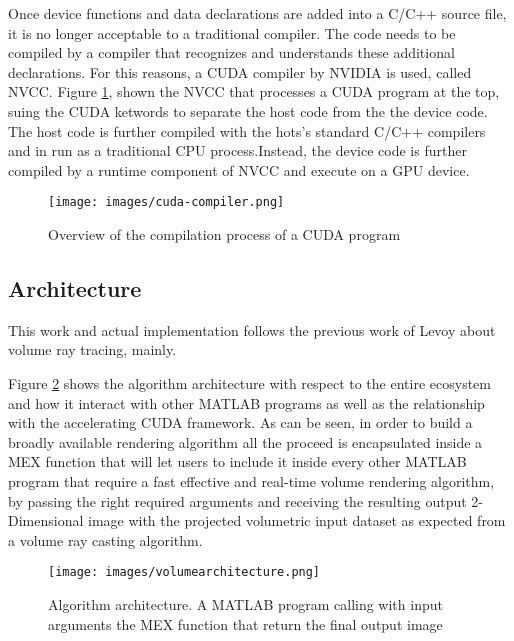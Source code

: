 \documentclass[12pt,a4paper]{extarticle}
\begin{document}
Once device functions and data declarations are added into a C/C++ source file, it is no longer acceptable to a traditional compiler. The code needs to be compiled by a compiler that recognizes and understands these additional declarations. For this reasons, a CUDA compiler by NVIDIA is used, called NVCC.
Figure \ref{fig:cudacompiler}, shown the NVCC that processes a CUDA program at the top, suing the CUDA ketwords to separate the host code from the the device code. The host code is further compiled with the hots's standard C/C++ compilers and in run as a traditional CPU process.Instead, the device code is further compiled by a runtime component of NVCC and execute on a GPU device.
\begin{figure}[hbtp]
\centering
\texttt{[image: images/cuda-compiler.png]}
\caption{Overview of the compilation process of a CUDA program}
\label{fig:cudacompiler}
\end{figure}



\subsection{Architecture} 
This work and actual implementation follows the previous work of Levoy about volume ray tracing, mainly.

Figure \ref{fig:architecture} shows the algorithm architecture with respect to the entire ecosystem and how it interact with other MATLAB programs as well as the relationship with the accelerating CUDA framework. As can be seen, in order to build a broadly available rendering algorithm all the proceed is encapsulated inside a MEX function that will let users to include it inside every other MATLAB program that require a fast effective and real-time volume rendering algorithm, by passing the right required arguments and receiving the resulting output 2-Dimensional image with the projected volumetric input dataset as expected from a volume ray casting algorithm.\cite{levoy_1988:4}

\begin{figure}[hbtp]
\centering
\texttt{[image: images/volumearchitecture.png]}
\caption{Algorithm architecture. A MATLAB program calling with input arguments the MEX function that return the final output image}
\label{fig:architecture}
\end{figure}
\end{document}
